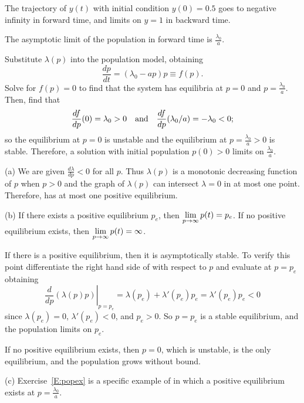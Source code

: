 \soln The trajectory of $y(t)$ with initial condition $y(0) = 0.5$ goes
to negative infinity in forward time, and limits on $y = 1$ in
backward time.

\begin{figure}[htb]
                       \centerline{%
                       }
\end{figure}


\newpage
{}
\ans The asymptotic limit of the population in forward time is
$\frac{\lambda_0}{a}$.

\soln Substitute $\lambda(p)$ into the population model, obtaining
\[
\frac{dp}{dt} = (\lambda_0 - ap)p\equiv f(p).
\]
Solve for $f(p)= 0$ to find that the system has equilibria
at $p = 0$ and $p = \frac{\lambda_0}{a}$.  Then, find that
\[
\frac{df}{dp}(0) = \lambda_0 > 0 \quad\mbox{and}\quad
\frac{df}{dp}(\lambda_0/a) = -\lambda_0 < 0;
\]
so the equilibrium at $p = 0$ is unstable and the equilibrium at
$p = \frac{\lambda_0}{a} > 0$ is stable.  Therefore, a solution with 
initial population $p(0) > 0$ limits on $\frac{\lambda_0}{a}$.

(a) We are given $\frac{d\lambda}{dp} < 0$ for all $p$.  Thus $\lambda(p)$ is a 
monotonic decreasing function of $p$ when $p>0$ and the graph of 
$\lambda(p)$ can intersect $\lambda=0$ in at most one point.
Therefore,  has at most one positive equilibrium.

(b) \ans If there exists a positive equilibrium $p_e$, then
$\displaystyle\lim_{p \to \infty} p(t) = p_e$.  If no positive equilibrium
exists, then $\displaystyle\lim_{p \to \infty} p(t) = \infty$.

\soln If there is a positive equilibrium, then it is asymptotically stable.
To verify this point differentiate the right hand side of  with respect to 
$p$ and evaluate at $p=p_e$ obtaining
\[
\left.\frac{d}{dp}(\lambda(p)p)\right|_{p=p_e} = 
\lambda(p_e) + \lambda'(p_e)p_e = \lambda'(p_e)p_e <0
\]
since $\lambda(p_e) = 0$, $\lambda'(p_e) < 0$, and $p_e > 0$.  
So $p = p_e$ is a stable equilibrium, and the population limits on
$p_e$.

\para If no positive equilibrium exists, then $p = 0$, which is unstable,
is the only equilibrium, and the population grows without bound.

(c) Exercise~\ref{E:popex} is a specific example of  in
which a positive equilibrium exists at $p = \frac{\lambda_0}{a}$.


